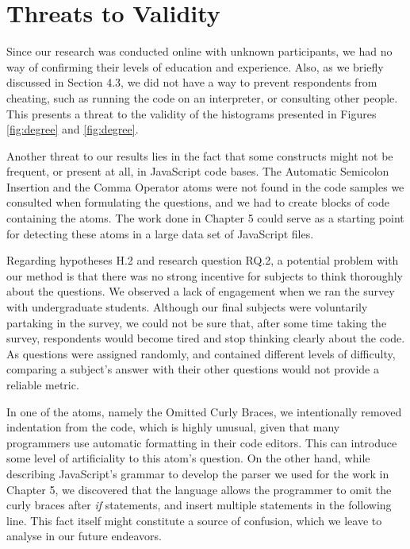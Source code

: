 \section{Threats to Validity}
\label{threat}

Since our research was conducted online with unknown participants, we had no way of confirming their levels of education and experience. Also, as we briefly discussed in Section 4.3, we did not have a way to prevent respondents from cheating, such as running the code on an interpreter, or consulting other people. This presents a threat to the validity of the histograms presented in Figures \ref{fig:degree} and \ref{fig:degree}.

Another threat to our results lies in the fact that some constructs might not be frequent, or present at all, in JavaScript code bases. The Automatic Semicolon Insertion and the Comma Operator atoms were not found in the code samples we consulted when formulating the questions, and we had to create blocks of code containing the atoms. The work done in Chapter 5 could serve as a starting point for detecting these atoms in a large data set of JavaScript files.

Regarding hypotheses H.2  and research question RQ.2, a potential problem with our method is that there was no strong incentive for subjects to think thoroughly about the questions. We observed a lack of engagement when we ran the survey with undergraduate students. Although our final subjects were voluntarily partaking in the survey, we could not be sure that, after some time taking the survey, respondents would become tired and stop thinking clearly about the code. As questions were assigned randomly, and contained different levels of difficulty, comparing a subject's answer with their other questions would not provide a reliable metric.

In one of the atoms, namely the Omitted Curly Braces, we intentionally removed indentation from the code, which is highly unusual, given that many programmers use automatic formatting in their code editors. This can introduce some level of artificiality to this atom's question. On the other hand, while describing JavaScript's grammar to develop the parser we used for the work in Chapter 5, we discovered that the language allows the programmer to omit the curly braces after \textit{if} statements, and insert multiple statements in the following line. This fact itself might constitute a source of confusion, which we leave to analyse in our future endeavors. 
